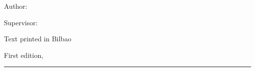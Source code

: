 
\thispagestyle{empty}

\hfill

\vfill

\medskip


\noindent
\textit{
\mytitle
}




Author: \myauthor

Supervisor: \myadvisor




\vfill

\vfill

\noindent


\noindent
Text printed in Bilbao

\noindent
First edition,
\monthname \ \the\year

\vspace{1cm}
\hrule
\bigskip

\cleardoublepage

%
%
%
%
%
%

